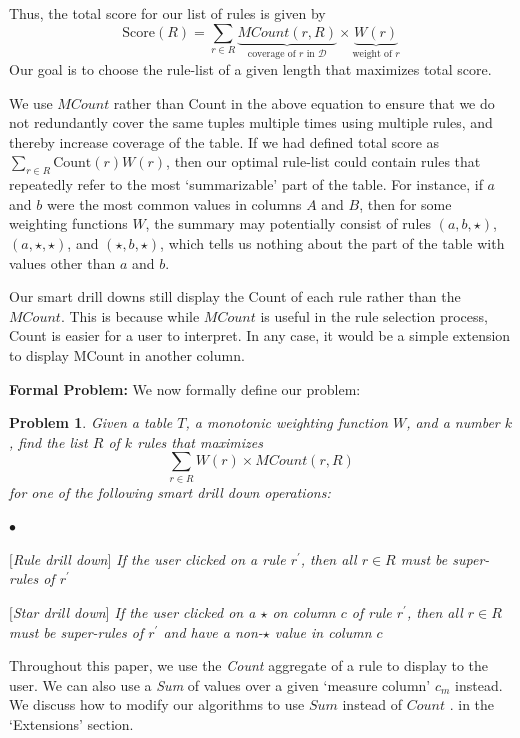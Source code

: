 \documentclass[10pt,journal,compsoc]{IEEEtran}
\newcounter{prob}
\newtheorem{problem}[prob]{Problem}
\newcommand{\stitle}[1]{\vspace{0.5em}\noindent\textbf{#1}}
\newcommand{\papertext}[1]{}
\newcommand{\techreporttext}[1]{#1}
\newcommand{\calD}{\mathcal{D}\xspace}
\newenvironment{denselist}{
    \begin{list}{\small{$\bullet$}}%
    {\setlength{\itemsep}{0ex} \setlength{\topsep}{0ex}
    \setlength{\parsep}{0pt} \setlength{\itemindent}{0pt}
    \setlength{\leftmargin}{1.5em}
    \setlength{\partopsep}{0pt}}}%
    {\end{list}}
\begin{document}
Thus, the total score for our list of rules is given by 
$$\text{Score}(R) = \sum_{r \in R} \underbrace{MCount(r, R)}_{\text{coverage of $r$ in $\calD$}} \times \underbrace{W(r)}_{\text{weight of $r$}}$$ 
Our goal is to choose the rule-list of a given length that maximizes 
total score. 


We use $MCount$ rather than Count in the above equation to ensure that we do not redundantly cover
the same tuples multiple times using multiple rules, and thereby increase coverage of the table. 
If we had defined total score as $\sum_{r \in R} \text{Count}(r)W(r)$, then our optimal rule-list could 
contain rules that repeatedly refer to the most `summarizable' part of the table. 
For instance, if $a$ and $b$ were the most common values in columns $A$ and $B$, then 
for some weighting functions $W$, 
the summary may potentially consist of rules $(a, b, \star)$, $(a, \star, \star)$, and $(\star, b, \star)$, which tells us nothing about the part of the table with values other than $a$ and $b$. 

Our smart drill downs still display the Count of each rule rather than the $MCount$. This is because while $MCount$ is useful in the rule selection process, Count is easier for a user to interpret. In any case, it would be a simple extension to display MCount in another column.

\stitle{Formal Problem:} We now formally define our problem:
\begin{problem}\label{prob:optimal-subrule-list}
Given a table $T$, a monotonic weighting function $W$, and a number $k$, find the list $R$ of $k$ rules that maximizes 
$$\sum_{r \in R} W(r) \times MCount(r,R)$$
for one of the following smart drill down operations:
\begin{denselist}
\item $[$Rule drill down$]$ If the user clicked on a rule $r^{\prime}$, then all $r \in R$ must be super-rules of $r^{\prime}$
\item $[$Star drill down$]$ If the user clicked on a $\star$ on column $c$ of rule $r^{\prime}$, then all $r \in R$ must be super-rules of $r^{\prime}$ and have a non-$\star$ value in column $c$
\end{denselist}
\end{problem}
\noindent Throughout this paper, we use the {\em Count} aggregate of a rule to display to the user. We can also use a {\em Sum} of values over a given `measure column' $c_m$ instead. We discuss how to modify our algorithms to use $Sum$ instead of $Count$ 
\papertext{in our technical report~\cite{tr}}.
\techreporttext{in the `Extensions' section.}
\end{document}

